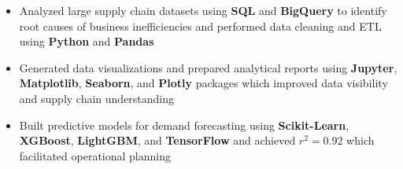 \documentclass[12pt,a4paper,roman]{moderncv}
\begin{document}
{{\begin{itemize}
\item Analyzed large supply chain datasets using \textbf{SQL} and \textbf{BigQuery} to identify root causes of business inefficiencies and performed data cleaning and ETL using \textbf{Python} and \textbf{Pandas}
\item Generated data visualizations and prepared analytical reports using \textbf{Jupyter}, \textbf{Matplotlib}, \textbf{Seaborn}, and \textbf{Plotly} packages which improved data visibility and supply chain understanding 
\item Built predictive models for demand forecasting using \textbf{Scikit-Learn}, \textbf{XGBoost}, \textbf{LightGBM}, and \textbf{TensorFlow} and achieved $r^2=0.92$ which facilitated operational planning

\end{itemize}}}
\end{document}
